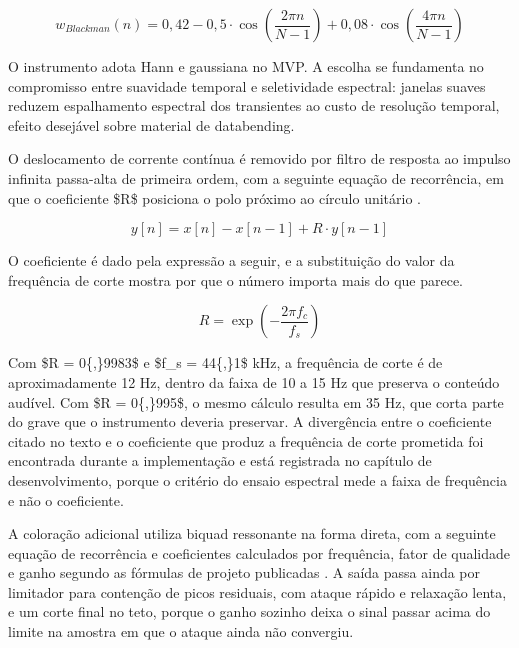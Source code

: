 \documentclass[12pt,a4paper]{article}
\begin{document}
\begin{equation}
w_{Blackman}(n) = 0{,}42 - 0{,}5 \cdot \cos\left(\frac{2 \pi n}{N - 1}\right) + 0{,}08 \cdot \cos\left(\frac{4 \pi n}{N - 1}\right)
\label{eq:blackman}
\end{equation}

O instrumento adota Hann e gaussiana no MVP. A escolha se fundamenta no compromisso entre suavidade temporal e seletividade espectral: janelas suaves reduzem espalhamento espectral dos transientes ao custo de resolução temporal, efeito desejável sobre material de databending.


O deslocamento de corrente contínua é removido por filtro de resposta ao impulso infinita passa-alta de primeira ordem, com a seguinte equação de recorrência, em que o coeficiente \$R\$ posiciona o polo próximo ao círculo unitário \cite{smith2007}.


\begin{equation}
y[n] = x[n] - x[n-1] + R \cdot y[n-1]
\label{eq:dcblocker}
\end{equation}

O coeficiente é dado pela expressão a seguir, e a substituição do valor da frequência de corte mostra por que o número importa mais do que parece.


\begin{equation}
R = \exp\left(-\frac{2 \pi f_c}{f_s}\right)
\label{eq:rcoef}
\end{equation}

Com \$R = 0\{,\}9983\$ e \$f\_s = 44\{,\}1\$ kHz, a frequência de corte é de aproximadamente 12 Hz, dentro da faixa de 10 a 15 Hz que preserva o conteúdo audível. Com \$R = 0\{,\}995\$, o mesmo cálculo resulta em 35 Hz, que corta parte do grave que o instrumento deveria preservar. A divergência entre o coeficiente citado no texto e o coeficiente que produz a frequência de corte prometida foi encontrada durante a implementação e está registrada no capítulo de desenvolvimento, porque o critério do ensaio espectral mede a faixa de frequência e não o coeficiente.


A coloração adicional utiliza biquad ressonante na forma direta, com a seguinte equação de recorrência e coeficientes calculados por frequência, fator de qualidade e ganho segundo as fórmulas de projeto publicadas \cite{smith2007, zolzer2011}. A saída passa ainda por limitador para contenção de picos residuais, com ataque rápido e relaxação lenta, e um corte final no teto, porque o ganho sozinho deixa o sinal passar acima do limite na amostra em que o ataque ainda não convergiu.
\end{document}
